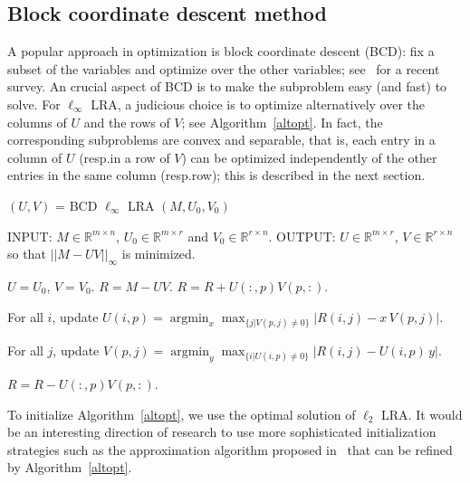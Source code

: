 \documentclass[a4paper,11pt]{article}
\numberwithin{equation}{section}
\DeclareMathOperator{\argmin}{argmin}
\begin{document}
\subsection{Block coordinate descent method}  

A popular approach in optimization is block coordinate descent (BCD): fix a subset of the variables and optimize over the other variables; 
see~\cite{wright2015coordinate} for a recent survey. An crucial aspect of BCD is to make the subproblem easy (and fast) to solve. 
For $\ell_{\infty}$ LRA, a judicious choice is to optimize alternatively over the columns of $U$ and the rows of $V$; 
see Algorithm~\ref{altopt}. 
In fact, the corresponding subproblems are convex and separable, that is, each entry in a column of $U$ (resp.\@ in a row of $V$) can be optimized independently of the other entries in the same column (resp.\@ row); this is described in the next section.  %
\begin{algorithm}
\caption{$(U,V)$ = BCD $\ell_{\infty}$ LRA $(M,U_0,V_0)$} 
\label{altopt}
\begin{algorithmic}[1]
\STATE INPUT:  $M \in \mathbb{R}^{m \times n}$, $U_0 \in \mathbb{R}^{m \times r}$ and $V_0 \in \mathbb{R}^{r \times n}$. 
\STATE OUTPUT: $U \in \mathbb{R}^{m \times r}$, $V \in \mathbb{R}^{r \times n}$ so that $||M-UV||_{\infty}$ is minimized. 

   \STATE $U = U_0$, $V = V_0$. 
			\STATE $R = M - UV$.
				  \STATE $R = R + U(:,p) V(p,:)$. 
					
					\STATE For all $i$, update $U(i,p) = \argmin_{x} \max_{ \{ j | V(p,j) \neq 0 \} } |R(i,j) - x  \, V(p,j)|$.
					
					\STATE For all $j$, update $V(p,j) = \argmin_{y} \max_{ \{ i | U(i,p) \neq 0 \} } |R(i,j) - U(i,p) \, y|$.
					
					\STATE $R = R - U(:,p) V(p,:)$.
					
					\ENDFOR
	\ENDFOR 
\end{algorithmic}
\end{algorithm}


To initialize Algorithm~\ref{altopt}, we use the optimal solution of $\ell_{2}$ LRA. 
It would be an interesting direction of research to use more sophisticated initialization strategies such as the approximation algorithm proposed in~\cite{CGKe17} that can be refined by Algorithm~\ref{altopt}.  
\end{document}
